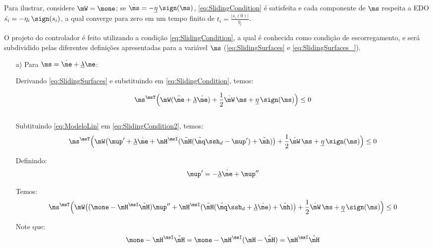 \documentclass[]{politex}
\begin{document}
Para ilustrar, considere $\mW = \mone$; se $\dot{\ms} = - \underline{\eta} \,\sign(\ms)$,  \eqref{eq:SlidingCondition} \'e satisfeita e cada componente de $\ms$ respeita a EDO $\dot{s_i} = - \eta_i \,\sign(s_i)$, a qual converge para zero em um tempo finito de $t_i = \frac{|s_i(0)|}{\eta_i}$.

O projeto do controlador \'e feito utilizando a condi\c{c}\~ao \eqref{eq:SlidingCondition}, a qual \'e conhecida como condi\c{c}\~ao de escorregamento, e será subdividido pelas diferentes definições apresentadas para a variável $\ms$ (\eqref{eq:SlidingSurfaces} e \eqref{eq:SlidingSurfaces_}).

\begin{itemize}
\item[a)] Para $\ms = \dot{\me} + \underline{\lambda}\me$:

Derivando \eqref{eq:SlidingSurfaces} e substituindo em \eqref{eq:SlidingCondition}, temos:

\begin{equation} \label{eq:SlidingCondition2}
\ms^\msT \Big(\mW (\ddot{\me} + \underline{\lambda} \dot{\me} ) + \frac{1}{2}\dot{\mW} \, \ms + \underline{\eta} \, \sign(\ms) \Big) \leq 0
\end{equation} \\



Subtituindo \eqref{eq:ModeloLin} em \eqref{eq:SlidingCondition2}, temos:
\begin{equation} \label{eq:SlidingCondition3}
\ms^\msT \Big(\mW \big(\mup' + \underline{\lambda} \dot{\me} + \mH^\msI( \tilde{\mH}(\ddot{\mq}\ssh_d - \mup') + \tilde{\mh} ) \big) + \frac{1}{2}\dot{\mW} \, \ms + \underline{\eta} \, \sign(\ms) \Big) \leq 0
\end{equation}

Definindo:
\begin{equation}
\mup' = - \underline{\lambda} \dot{\me} + \mup''
\end{equation}

Temos:
\begin{equation} \label{eq:SlidingCondition3_}
\ms^\msT \Big(\mW \big( (\mone - \mH^\msI \tilde{\mH} )\mup'' + \mH^\msI( \tilde{\mH}(\ddot{\mq}\ssh_d + \underline{\lambda} \dot{\me}) + \tilde{\mh} ) \big) + \frac{1}{2}\dot{\mW} \, \ms + \underline{\eta} \, \sign(\ms) \Big) \leq 0
\end{equation}

Note que:
\begin{equation}
\mone - \mH^\msI \tilde{\mH} = \mone - \mH^\msI ( \mH - \hat{\mH}) = \mH^\msI \hat{\mH}
\end{equation}


\end{itemize}
\end{document}
